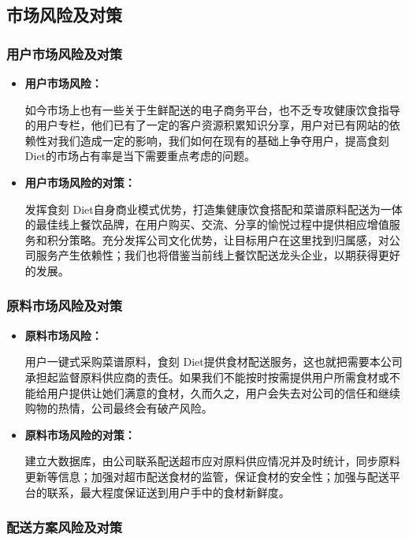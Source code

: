\documentclass[UTF8,12pt]{ctexart}
\numberwithin{figure}{section}%
\begin{document}
\begin{spacing}{2}
\subsection{市场风险及对策}
\subsubsection{用户市场风险及对策}

\begin{itemize}
	\item \textbf{用户市场风险：}
	
	如今市场上也有一些关于生鲜配送的电子商务平台，也不乏专攻健康饮食指导的用户专栏，他们已有了一定的客户资源积累知识分享，用户对已有网站的依赖性对我们造成一定的影响，我们如何在现有的基础上争夺用户，提高食刻 Diet的市场占有率是当下需要重点考虑的问题。
	
	\item \textbf{用户市场风险的对策：}
	
	发挥食刻 Diet自身商业模式优势，打造集健康饮食搭配和菜谱原料配送为一体的最佳线上餐饮品牌，在用户购买、交流、分享的愉悦过程中提供相应增值服务和积分策略。充分发挥公司文化优势，让目标用户在这里找到归属感，对公司服务产生依赖性；我们也将借鉴当前线上餐饮配送龙头企业，以期获得更好的发展。
	
\end{itemize}
\subsubsection{原料市场风险及对策}

\begin{itemize}
	\item \textbf{原料市场风险：}
	
	用户一键式采购菜谱原料，食刻 Diet提供食材配送服务，这也就把需要本公司承担起监督原料供应商的责任。如果我们不能按时按需提供用户所需食材或不能给用户提供让她们满意的食材，久而久之，用户会失去对公司的信任和继续购物的热情，公司最终会有破产风险。
	
	\item \textbf{原料市场风险的对策：}
	
	建立大数据库，由公司联系配送超市应对原料供应情况并及时统计，同步原料更新等信息；加强对超市配送食材的监管，保证食材的安全性；加强与配送平台的联系，最大程度保证送到用户手中的食材新鲜度。
	
\end{itemize}
\subsubsection{配送方案风险及对策}


\end{spacing}
\end{document}
